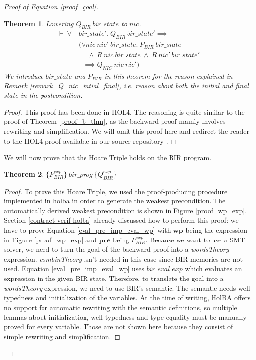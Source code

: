 \documentclass{kththesis}
\newcommand{\htriple}[3]{\ensuremath{\{#1\}~#2~\{#3\}}}
\newtheorem{theorem}{Theorem}[section]
\begin{document}
\begin{proof}[Proof of Equation \ref{proof_goal}]
\begin{theorem} \label{proof_d_thm}
Lowering $Q_{BIR}~bir\_state$ to $nic$.
\begin{equation*} \label{proof_d_thm_eq}
\begin{split}
\vdash~\forall~&bir\_state'.~Q_{BIR}~bir\_state' \implies\\
	&(\forall nic~nic'~bir\_state.~P_{BIR}~bir\_state\\
	&~~~~~~\land~R~nic~bir\_state~\land~R~nic'~bir\_state'\\
	&~~~\implies Q_{NIC}~nic~nic')
\end{split}
\end{equation*}
We introduce $bir\_state$ and $P_{BIR}$ in this theorem for the reason explained in Remark \ref{remark_Q_nic_intial_final}, i.e. reason about both the initial and final state in the postcondition.
\end{theorem}

\begin{proof}
This proof has been done in HOL4. The reasoning is quite similar to the proof of Theorem \ref{proof_b_thm}, as the backward proof mainly involves rewriting and simplification. We will omit this proof here and redirect the reader to the HOL4 proof available in our source repository \cite{lacroix_trustful_2019}.
\end{proof}

We will now prove that the Hoare Triple holds on the BIR program.
\bigskip

\begin{theorem} \label{proof_ht_thm}
\htriple{P^{exp}_{BIR}}{bir\_prog}{Q^{exp}_{BIR}}
\end{theorem}

\begin{proof}
To prove this Hoare Triple, we used the proof-producing procedure implemented in \gls{holba} in order to generate the weakest precondition. The automatically derived weakest precondition is shown in Figure \ref{proof_wp_exp}. Section \ref{contract-verif-holba} already discussed how to perform this proof: we have to prove Equation \ref{eval_pre_imp_eval_wp} with $\mathbf{wp}$ being the expression in Figure \ref{proof_wp_exp} and $\mathbf{pre}$ being $P^{exp}_{BIR}$. Because we want to use a \gls{SMT} solver, we need to turn the goal of the backward proof into a \textit{wordsTheory} expression. \textit{combinTheory} isn't needed in this case since BIR memories are not used. Equation \ref{eval_pre_imp_eval_wp} uses $bir\_eval\_exp$ which evaluates an expression in the given BIR state. Therefore, to translate the goal into a \textit{wordsTheory} expression, we need to use BIR's semantic. The semantic needs well-typedness and initialization of the variables. At the time of writing, HolBA offers no support for automatic rewriting with the semantic definitions, so multiple lemmas about initialization, well-typedness and type equality must be manually proved for every variable. Those are not shown here because they consist of simple rewriting and simplification.


\end{proof}
\end{proof}
\end{document}
